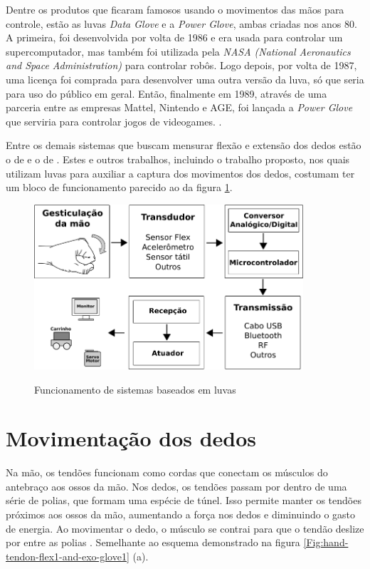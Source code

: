 \documentclass[
	12pt,				%
	openright,			%
	oneside,			%
	a4paper,			%
	english,			%
	brazil				%
	]{abntex2}
\begin{document}
		Dentre os produtos que ficaram famosos usando o movimentos das mãos para controle, estão as luvas \textit{Data Glove} e a \textit{Power Glove}, ambas criadas nos anos 80. A primeira, foi desenvolvida por volta de 1986 e era usada para controlar um supercomputador, mas também foi utilizada pela \textit{NASA (National Aeronautics and Space Administration)} para controlar robôs. Logo depois, por volta de 1987, uma licença foi comprada para desenvolver uma outra versão da luva, só que seria para uso do público em geral. Então, finalmente em 1989, através de uma parceria entre as empresas Mattel, Nintendo e AGE, foi lançada a \textit{Power Glove} que serviria para controlar jogos de videogames. \cite{dana1989powerglove}.

		Entre os demais sistemas que buscam mensurar flexão e extensão dos dedos estão o de \cite{syed2012armcontroller} e o de \cite{michela2013rehab}. Estes e outros trabalhos, incluindo o trabalho proposto, nos quais utilizam luvas para auxiliar a captura dos movimentos dos dedos, costumam ter um bloco de funcionamento parecido ao da figura \ref{Fig:flowchart1}.


		\begin{figure}[h!]
			\centering
			\caption{Funcionamento de sistemas baseados em luvas}
  		\includegraphics[width=10cm]{./figures/flowchart1.png}
  		\label{Fig:flowchart1}
		\end{figure}


		\section{Movimentação dos dedos} \label{movimentacaodosdedos}


		Na mão, os tendões funcionam como cordas que conectam os músculos do antebraço aos ossos da mão. Nos dedos, os tendões passam por dentro de uma série de polias, que formam uma espécie de túnel. Isso permite manter os tendões próximos aos ossos da mão, aumentando a força nos dedos e diminuindo o gasto de energia. Ao movimentar o dedo, o músculo se contrai para que o tendão deslize por entre as polias \cite{drricardocirurgiao}. Semelhante ao esquema demonstrado na figura \ref{Fig:hand-tendon-flex1-and-exo-glove1} (a).
\end{document}
